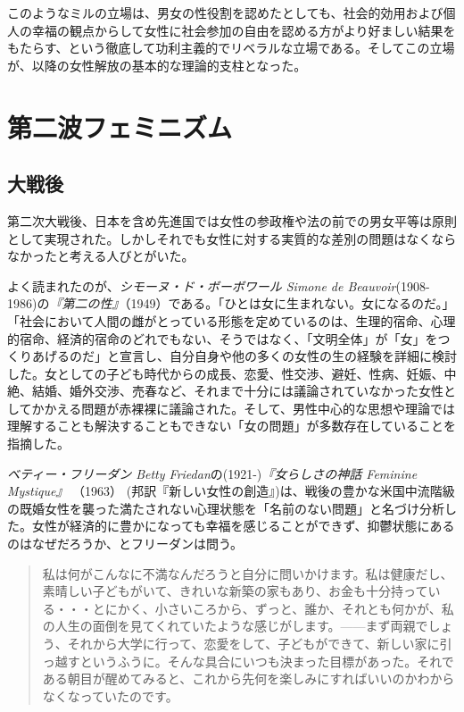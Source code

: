 \documentclass[dvipdfmx,uplatex]{jsarticle}
\begin{document}
 このようなミルの立場は、男女の性役割を認めたとしても、社会的効用および個人の幸福の観点からして女性に社会参加の自由を認める方がより好ましい結果をもたらす、という徹底して功利主義的でリベラルな立場である。そしてこの立場が、以降の女性解放の基本的な理論的支柱となった。


\section{第二波フェミニズム}



\subsection{大戦後}

第二次大戦後、日本を含め先進国では女性の参政権や法の前での男女平等は原則として実現された。しかしそれでも女性に対する実質的な差別の問題はなくならなかったと考える人びとがいた。


よく読まれたのが、\emph{シモーヌ・ド・ボーボワール Simone de Beauvoir}(1908-1986)の\emph{『第二の性』}（1949）である。「ひとは女に生まれない。女になるのだ。」「社会において人間の雌がとっている形態を定めているのは、生理的宿命、心理的宿命、経済的宿命のどれでもない、そうではなく、「文明全体」が「女」をつくりあげるのだ」と宣言し、自分自身や他の多くの女性の生の経験を詳細に検討した。女としての子ども時代からの成長、恋愛、性交渉、避妊、性病、妊娠、中絶、結婚、婚外交渉、売春など、それまで十分には議論されていなかった女性としてかかえる問題が赤裸裸に議論された。そして、男性中心的な思想や理論では理解することも解決することもできない「女の問題」が多数存在していることを指摘した。



\emph{ベティー・フリーダン Betty Friedan}の(1921-)\emph{『女らしさの神話 Feminine Mystique』} （1963） (邦訳『新しい女性の創造』)は、戦後の豊かな米国中流階級の既婚女性を襲った満たされない心理状態を「名前のない問題」と名づけ分析した。女性が経済的に豊かになっても幸福を感じることができず、抑鬱状態にあるのはなぜだろうか、とフリーダンは問う。

\begin{quote}
  私は何がこんなに不満なんだろうと自分に問いかけます。私は健康だし、素晴しい子どもがいて、きれいな新築の家もあり、お金も十分持っている・・・とにかく、小さいころから、ずっと、誰か、それとも何かが、私の人生の面倒を見てくれていたような感じがします。——まず両親でしょう、それから大学に行って、恋愛をして、子どもができて、新しい家に引っ越すというふうに。そんな具合にいつも決まった目標があった。それである朝目が醒めてみると、これから先何を楽しみにすればいいのかわからなくなっていたのです。
\end{quote}
\end{document}
